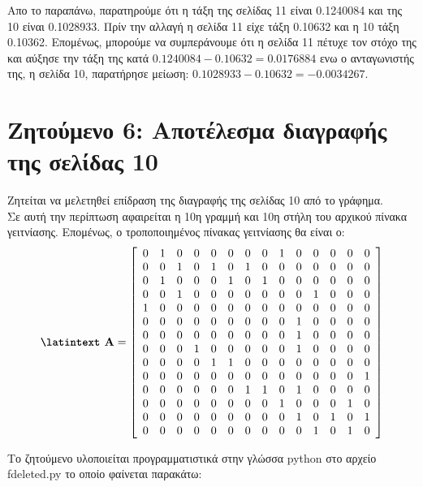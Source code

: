 \documentclass[a4paper,11pt]{article}
\newcommand{\lt}{\latintext}
\begin{document}
Απο το παραπάνω, παρατηρούμε ότι η τάξη της σελίδας 11 είναι 0.1240084 και της 10 είναι 0.1028933. Πρίν την αλλαγή η σελίδα 11 είχε τάξη 0.10632 και η 10 τάξη 0.10362. Επομένως, μπορούμε να συμπεράνουμε ότι η σελίδα 11 πέτυχε τον στόχο της και αύξησε την τάξη της κατά $0.1240084 - 0.10632 = 0.0176884$ ενω ο ανταγωνιστής της, η σελίδα 10, παρατήρησε μείωση: $0.1028933 - 0.10632 = -0.0034267$.

\section*{Ζητούμενο 6: Αποτέλεσμα διαγραφής της σελίδας 10}
Ζητείται να μελετηθεί επίδραση της διαγραφής της σελίδας 10 από το γράφημα.\\
Σε αυτή την περίπτωση αφαιρείται η 10η γραμμή και 10η στήλη του αρχικού πίνακα γειτνίασης. Επομένως, ο τροποποιημένος πίνακας γειτνίασης θα είναι ο:\\
\[\textbf{{\lt A}}=
    \left[ \begin{array}{cccccccccccccc}
    0 & 1 & 0 & 0 & 0 & 0 & 0 & 0 & 1 & 0 & 0 & 0 & 0 & 0 \\
    0 & 0 & 1 & 0 & 1 & 0 & 1 & 0 & 0 & 0 & 0 & 0 & 0 & 0 \\
    0 & 1 & 0 & 0 & 0 & 1 & 0 & 1 & 0 & 0 & 0 & 0 & 0 & 0 \\
    0 & 0 & 1 & 0 & 0 & 0 & 0 & 0 & 0 & 0 & 1 & 0 & 0 & 0 \\
    1 & 0 & 0 & 0 & 0 & 0 & 0 & 0 & 0 & 0 & 0 & 0 & 0 & 0 \\
    0 & 0 & 0 & 0 & 0 & 0 & 0 & 0 & 0 & 1 & 0 & 0 & 0 & 0 \\
    0 & 0 & 0 & 0 & 0 & 0 & 0 & 0 & 0 & 1 & 0 & 0 & 0 & 0 \\
    0 & 0 & 0 & 1 & 0 & 0 & 0 & 0 & 0 & 1 & 0 & 0 & 0 & 0 \\
    0 & 0 & 0 & 0 & 1 & 1 & 0 & 0 & 0 & 0 & 0 & 0 & 0 & 0 \\
    0 & 0 & 0 & 0 & 0 & 0 & 0 & 0 & 0 & 0 & 0 & 0 & 0 & 1 \\
    0 & 0 & 0 & 0 & 0 & 0 & 1 & 1 & 0 & 1 & 0 & 0 & 0 & 0 \\
    0 & 0 & 0 & 0 & 0 & 0 & 0 & 0 & 1 & 0 & 0 & 0 & 1 & 0 \\
    0 & 0 & 0 & 0 & 0 & 0 & 0 & 0 & 0 & 1 & 0 & 1 & 0 & 1 \\
    0 & 0 & 0 & 0 & 0 & 0 & 0 & 0 & 0 & 0 & 1 & 0 & 1 & 0 
    \end{array} \right]
\]

Το ζητούμενο υλοποιείται προγραμματιστικά στην γλώσσα {\lt python} στο αρχείο {\lt f\textunderscore deleted.py}  το οποίο φαίνεται παρακάτω:\\
\end{document}
